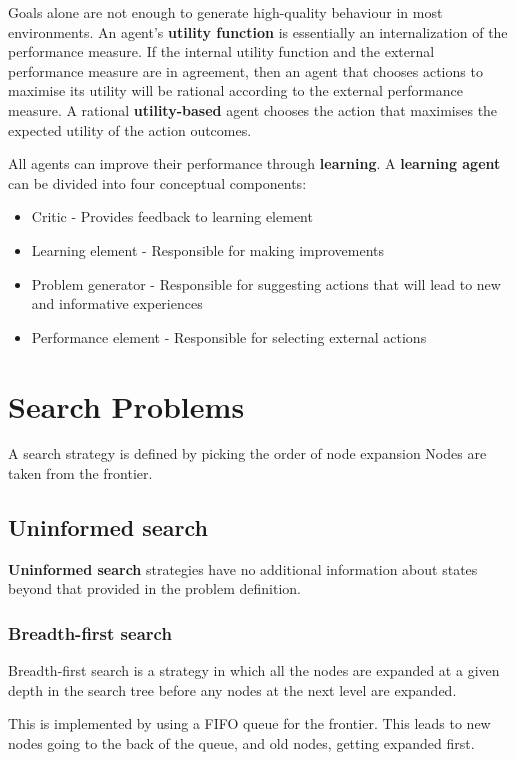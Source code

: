 \documentclass{article}
\begin{document}
Goals alone are not enough to generate high-quality behaviour in most environments. An agent's \textbf{utility function} is essentially an internalization of the performance measure. If the internal utility function and the external performance measure are in agreement, then an agent that chooses actions to maximise its utility will be rational according to the external performance measure. A rational \textbf{utility-based} agent chooses the action that maximises the expected utility of the action outcomes. \newline

All agents can improve their performance through \textbf{learning}. A \textbf{learning agent} can be divided into four conceptual components:
\begin{itemize}
    \item Critic - Provides feedback to learning element
    \item Learning element - Responsible for making improvements
    \item Problem generator - Responsible for suggesting actions that will lead to new and informative experiences
    \item Performance element - Responsible for selecting external actions
\end{itemize}

\section{Search Problems}

A search strategy is defined by picking the order of node expansion
Nodes are taken from the frontier. 

\subsection{Uninformed search}

\textbf{Uninformed search} strategies have no additional information about states beyond that provided in the problem definition. 

\subsubsection{Breadth-first search}

Breadth-first search is a strategy in which all the nodes are expanded at a given depth in the search tree before any nodes at the next level are expanded. 

This is implemented by using a FIFO queue for the frontier. This leads to new nodes going to the back of the queue, and old nodes, getting expanded first. 
\end{document}

